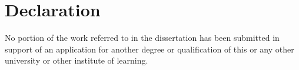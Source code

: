 \chapter*{Declaration}


No portion of the work referred to in the dissertation has been submitted in support of an application for another degree or qualification of this or any other university or other institute of learning.

\cleardoublepage

\endinput
